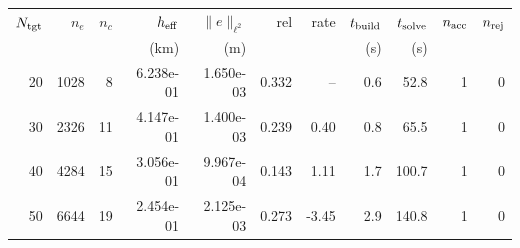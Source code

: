 \begin{tabular}{rrrrrrrrrrr}
\hline
$N_{\rm tgt}$ & $n_e$ & $n_c$ & $h_{\rm eff}$ & $\|e\|_{\ell^2}$ & rel & rate & $t_{\rm build}$ & $t_{\rm solve}$ & $n_{\rm acc}$ & $n_{\rm rej}$ \\
 & & & (km) & (m) & & & (s) & (s) & & \\
\hline
20 & 1028 & 8 & 6.238e-01 & 1.650e-03 & 0.332 & -- & 0.6 & 52.8 & 1 & 0 \\
30 & 2326 & 11 & 4.147e-01 & 1.400e-03 & 0.239 & 0.40 & 0.8 & 65.5 & 1 & 0 \\
40 & 4284 & 15 & 3.056e-01 & 9.967e-04 & 0.143 & 1.11 & 1.7 & 100.7 & 1 & 0 \\
50 & 6644 & 19 & 2.454e-01 & 2.125e-03 & 0.273 & -3.45 & 2.9 & 140.8 & 1 & 0 \\
\hline
\end{tabular}
